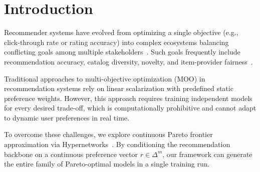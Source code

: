 \section{Introduction}
\label{sec:intro}

Recommender systems have evolved from optimizing a single objective (e.g., click-through rate or rating accuracy) into complex ecosystems balancing conflicting goals among multiple stakeholders~\citep{abdollahpouri2020multistakeholder}. Such goals frequently include recommendation accuracy, catalog diversity, novelty, and item-provider fairness~\citep{milojkovic2020multi}.

Traditional approaches to multi-objective optimization (MOO) in recommendation systems rely on linear scalarization with predefined static preference weights. However, this approach requires training independent models for every desired trade-off, which is computationally prohibitive and cannot adapt to dynamic user preferences in real time.

To overcome these challenges, we explore continuous Pareto frontier approximation via Hypernetworks~\citep{navon2020learning}. By conditioning the recommendation backbone on a continuous preference vector $r \in \Delta^m$, our framework can generate the entire family of Pareto-optimal models in a single training run.
